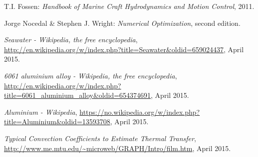 \begin{thebibliography}{9}

  T.I. Fossen:
  \emph{Handbook of Marine Craft Hydrodynamics and Motion Control},
  2011.

  Jorge Nocedal & Stephen J. Wright:
  \emph{ Numerical Optimization},
  second edition.

  \emph{ Seawater - Wikipedia, the free encyclopedia},
  \url{http://en.wikipedia.org/w/index.php?title=Seawater&oldid=659024437}, April 2015.

  \emph{6061 aluminium alloy - Wikipedia, the free encyclopedia},
  \url{http://en.wikipedia.org/w/index.php?title=6061_aluminium_alloy&oldid=654374691}, April 2015.

  \emph{Aluminium - Wikipedia},
  \url{https://no.wikipedia.org/w/index.php?title=Aluminium&oldid=13593708}, April 2015.

  \emph{Typical Convection Coefficients to Estimate Thermal Transfer},
  \url{http://www.me.mtu.edu/~microweb/GRAPH/Intro/film.htm}, April 2015.

\end{thebibliography}